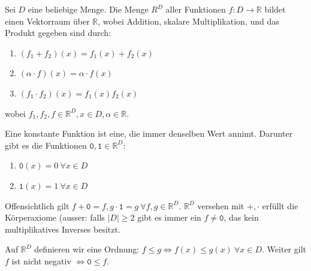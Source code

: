 Sei $D$ eine beliebige Menge. Die Menge $R^D$ aller Funktionen $f:D\rightarrow \mathbb{R}$ bildet einen Vektorraum über $\mathbb{R}$, wobei Addition, skalare Multiplikation, und das Produkt gegeben sind durch: 
\begin{enumerate}
    \item $(f_1+f_2)(x)=f_1(x)+f_2(x)$
    \item $(\alpha \cdot f)(x)=\alpha \cdot f(x)$
    \item $(f_1\cdot f_2)(x)=f_1(x)f_2(x)$
\end{enumerate}
wobei $f_1,f_2,f\in\mathbb{R}^D,x\in D,\alpha\in\mathbb{R}$.

Eine konstante Funktion ist eine, die immer denselben Wert annimt. Darunter gibt es die Funktionen $\mathtt{0},\mathtt{1}\in\mathbb{R}^D$:
\begin{enumerate}
    \item $\mathtt{0}(x)=0\ \forall x\in D$
    \item $\mathtt{1}(x)=1\ \forall x\in D$
\end{enumerate}
Offensichtlich gilt $f+\mathtt{0}=f,g\cdot\mathtt{1}=g\ \forall f,g\in\mathbb{R}^D$. $\mathbb{R}^D$ versehen mit $+,\cdot$ erfüllt die Körperaxiome (ausser: falls $|D|\geq 2$ gibt es immer ein $f\not = \mathtt{0}$, das kein multiplikatives Inverses besitzt.

Auf $\mathbb{R}^D$ definieren wir eine Ordnung: $f\leq g \Leftrightarrow f(x)\leq g(x)\ \forall x\in D$. Weiter gilt $f$ ist nicht negativ $\Leftrightarrow \mathtt{0}\leq f$.


